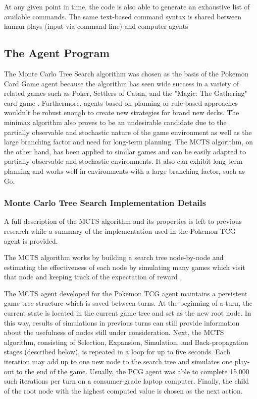 \documentclass{article}
\begin{document}
At any given point in time, the code is also able to generate an exhaustive list of available commands.  The same text-based command syntax is shared between human plays (input via command line) and computer agents

\subsection{The Agent Program} %
The Monte Carlo Tree Search algorithm was chosen as the basis of the Pokemon Card Game agent because the algorithm has seen wide success in a variety of related games such as Poker, Settlers of Catan, and the "Magic: The Gathering" card game \cite{mcts2012}. Furthermore, agents based on planning or rule-based approaches wouldn't be robust enough to create new strategies for brand new decks. The minimax algorithm also proves to be an undesirable candidate due to the partially observable and stochastic nature of the game environment as well as the large branching factor and need for long-term planning. The MCTS algorithm, on the other hand, has been applied to similar games and can be easily adapted to partially observable and stochastic environments. It also can exhibit long-term planning and works well in environments with a large branching factor, such as Go. 

\subsubsection{Monte Carlo Tree Search Implementation Details} %
A full description of the MCTS algorithm and its properties is left to previous research while a summary of the implementation used in the Pokemon TCG agent is provided. 

The MCTS algorithm works by building a search tree node-by-node and estimating the effectiveness of each node by simulating many games which visit that node and keeping track of the expectation of reward \cite{mctsweb}. 

The MCTS agent developed for the Pokemon TCG agent maintains a persistent game tree structure which is saved between turns. At the beginning of a turn, the current state is located in the current game tree and set as the new root node. In this way, results of simulations in previous turns can still provide information about the usefulness of nodes still under consideration. Next, the MCTS algorithm, consisting of Selection, Expansion, Simulation, and Back-propagation stages (described below), is repeated in a loop for up to five seconds. Each iteration may add up to one new node to the search tree and simulates one play-out to the end of the game. Usually, the PCG agent was able to complete 15,000 such iterations per turn on a consumer-grade laptop computer. Finally, the child of the root node with the highest computed value is chosen as the next action. 
\end{document}
